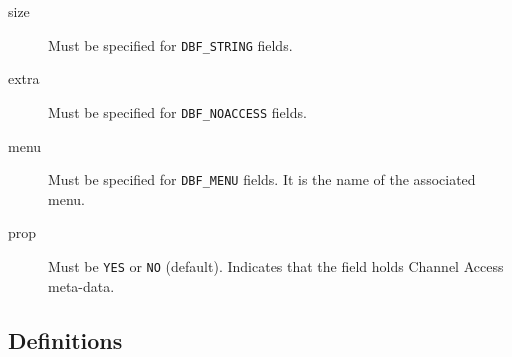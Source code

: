 \begin{description}
\item [size] Must be specified for \verb|DBF_STRING| fields.

\item [extra] Must be specified for \verb|DBF_NOACCESS| fields.

\item [menu] Must be specified for \verb|DBF_MENU| fields.
It is the name of the associated menu.

\item [prop] Must be \verb|YES| or \verb|NO| (default).
Indicates that the field holds Channel Access meta-data.
\end{description}

\subsection{Definitions}

